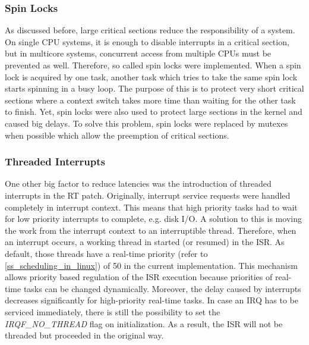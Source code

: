 \subsubsection{Spin Locks}
As discussed before, large critical sections reduce the responsibility of a system.
On single \ac{CPU} systems, it is enough to disable interrupts in a critical section, but in multicore systems, concurrent access from multiple \acp{CPU} must be prevented as well.
Therefore, so called spin locks were implemented. 
When a spin lock is acquired by one task, another task which tries to take the same spin lock starts spinning in a busy loop.
The purpose of this is to protect very short critical sections where a context switch takes more time than waiting for the other task to finish.
Yet, spin locks were also used to protect large sections in the kernel and caused big delays.
To solve this problem, spin locks were replaced by mutexes when possible which allow the preemption of critical sections.   

\subsubsection{Threaded Interrupts}\label{ss_threaded_interrupts}
One other big factor to reduce latencies was the introduction of threaded interrupts in the RT patch.
Originally, interrupt service requests were handled completely in interrupt context.
This means that high priority tasks had to wait for low priority interrupts to complete, e.g. disk \ac{I/O}.
A solution to this is moving the work from the interrupt context to an interruptible thread.
Therefore, when an interrupt occurs, a working thread in started (or resumed) in the \ac{ISR}.
As default, those threads have a real-time priority (refer to \ref{ss_scheduling_in_linux}) of 50 in the current implementation.
This mechanism allows priority based regulation of the \ac{ISR} execution because priorities of real-time tasks can be changed dynamically. 
Moreover, the delay caused by interrupts decreases significantly for high-priority real-time tasks.
In case an \ac{IRQ} has to be serviced immediately, there is still the possibility to set the \textit{IRQF\_NO\_THREAD} flag on initialization.
As a result, the \ac{ISR} will not be threaded but proceeded in the original way.


